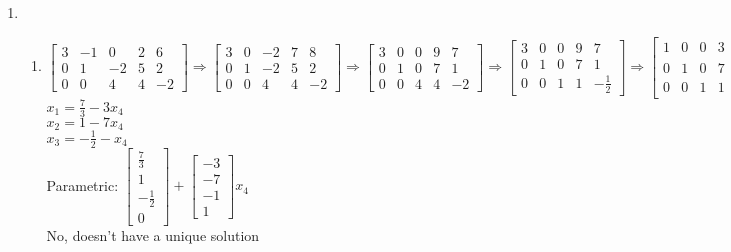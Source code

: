 \documentclass[leqno]{article}
\begin{document}
\begin{enumerate}
    \item
    \begin{enumerate}
        \item
        $\begin{bmatrix}
        3 & -1 & 0 & 2 & 6 \\
        0 & 1 & -2 & 5 & 2 \\
        0 & 0 & 4 & 4 & -2
        \end{bmatrix} \Rightarrow \begin{bmatrix}
        3 & 0 & -2 & 7 & 8 \\
        0 & 1 & -2 & 5 & 2 \\
        0 & 0 & 4 & 4 & -2
        \end{bmatrix} \Rightarrow \begin{bmatrix}
        3 & 0 & 0 & 9 & 7 \\
        0 & 1 & 0 & 7 & 1 \\
        0 & 0 & 4 & 4 & -2
        \end{bmatrix} \Rightarrow \begin{bmatrix}
        3 & 0 & 0 & 9 & 7 \\
        0 & 1 & 0 & 7 & 1 \\
        0 & 0 & 1 & 1 & -\frac 1 2
        \end{bmatrix} \Rightarrow \begin{bmatrix}
        1 & 0 & 0 & 3 & \frac 7 3 \\
        0 & 1 & 0 & 7 & 1 \\
        0 & 0 & 1 & 1 & -\frac 1 2
        \end{bmatrix}$\\
        $x_1 = \frac 7 3 - 3x_4$\\
        $x_2 = 1 - 7x_4$\\
        $x_3 = -\frac 1 2 - x_4$\\
        Parametric: $\displaystyle \begin{bmatrix}\frac 7 3 \\ 1 \\ -\frac 1 2 \\ 0\end{bmatrix} + \begin{bmatrix}-3 \\ -7 \\ -1 \\ 1\end{bmatrix}x_4$\\
        No, doesn't have a unique solution

\end{enumerate}
\end{enumerate}
\end{document}
